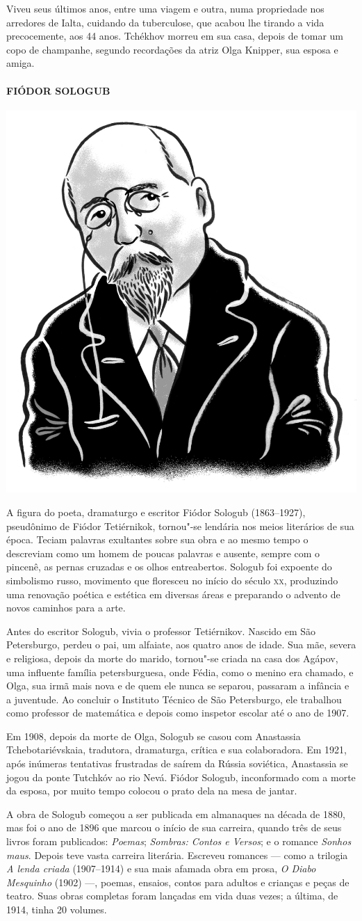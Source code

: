 {Viveu seus últimos anos, entre uma viagem e outra, numa propriedade nos
arredores de Ialta, cuidando da tuberculose, que acabou lhe tirando a
vida precocemente, aos 44 anos. Tchékhov morreu em sua casa, depois de
tomar um copo de champanhe, segundo recordações da atriz Olga Knipper,
sua esposa e amiga.

\paragraph{FIÓDOR SOLOGUB}

\noindent\includegraphics[width=.8in]{./imgs/autor7.jpg}

\noindent{}A figura do poeta, dramaturgo e escritor Fiódor Sologub (1863--1927),
pseudônimo de Fiódor Tetiérnikok, tornou"-se lendária nos meios
literários de sua época. Teciam palavras exultantes sobre sua obra e ao
mesmo tempo o descreviam como um homem de poucas palavras e ausente,
sempre com o pincenê, as pernas cruzadas e os olhos entreabertos.
Sologub foi expoente do simbolismo russo, movimento que floresceu no início do
século \textsc{xx}, produzindo uma renovação poética e estética em diversas áreas
e preparando o advento de novos caminhos para a arte.

Antes do escritor Sologub, vivia o professor Tetiérnikov. Nascido em São
Petersburgo, perdeu o pai, um alfaiate, aos quatro anos de idade. Sua
mãe, severa e religiosa, depois da morte do marido, tornou"-se criada na
casa dos Agápov, uma influente família petersburguesa, onde Fédia, como
o menino era chamado, e Olga, sua irmã mais nova e de quem ele nunca se
separou, passaram a infância e a juventude. Ao concluir o Instituto
Técnico de São Petersburgo, ele trabalhou como professor de matemática e
depois como inspetor escolar até o ano de 1907.

Em 1908, depois da morte de Olga, Sologub se casou com Anastassia
Tchebotariévskaia, tradutora, dramaturga, crítica e sua colaboradora. Em
1921, após inúmeras tentativas frustradas de saírem da Rússia soviética,
Anastassia se jogou da ponte Tutchkóv ao rio Nevá. Fiódor Sologub,
inconformado com a morte da esposa, por muito tempo colocou o prato dela
na mesa de jantar.

A obra de Sologub começou a ser publicada em almanaques na década de
1880, mas foi o ano de 1896 que marcou o início de sua carreira, quando
três de seus livros foram publicados: \emph{Poemas}; \emph{Sombras:
Contos e Versos}; e o romance \emph{Sonhos maus}. Depois teve vasta
carreira literária. Escreveu romances --- como a trilogia \emph{A lenda
criada} (1907--1914) e sua mais afamada obra em
prosa, \emph{O Diabo Mesquinho} (1902) ---, poemas,
ensaios, contos para adultos e crianças e peças de teatro. Suas obras
completas foram lançadas em vida duas vezes; a última, de 1914, tinha 20
volumes.

}
